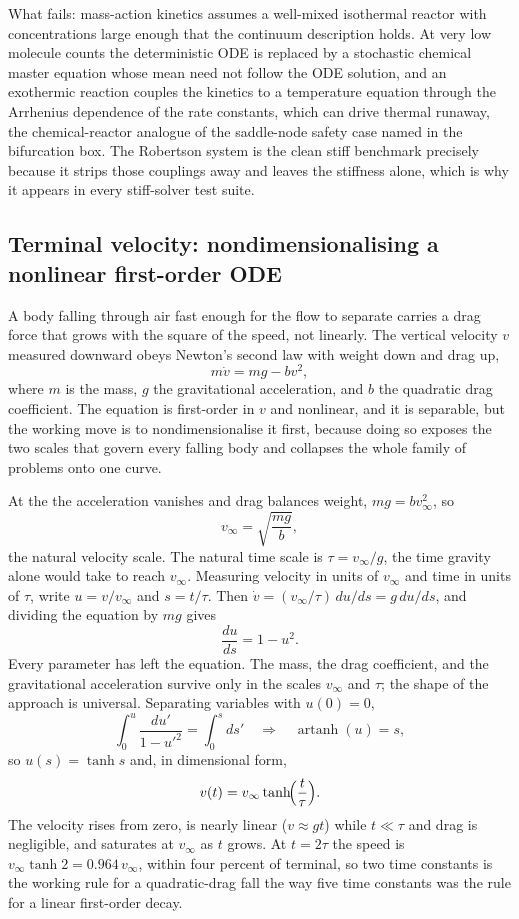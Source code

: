 What fails: mass-action kinetics assumes a well-mixed isothermal
reactor with concentrations large enough that the continuum
description holds. At very low molecule counts the deterministic ODE is
replaced by a stochastic chemical master equation whose mean need not
follow the ODE solution, and an exothermic reaction couples the
kinetics to a temperature equation through the Arrhenius dependence of
the rate constants, which can drive thermal runaway, the
chemical-reactor analogue of the saddle-node safety case named in the
bifurcation box. The Robertson system is the clean stiff benchmark
precisely because it strips those couplings away and leaves the
stiffness alone, which is why it appears in every stiff-solver test
suite.

\subsection{Terminal velocity: nondimensionalising a nonlinear first-order ODE}

A body falling through air fast enough for the flow to separate carries
a drag force that grows with the square of the speed, not linearly. The
vertical velocity $v$ measured downward obeys Newton's second law with
weight down and drag up,
\[
m \dot{v} = m g - b v^{2},
\]
where $m$ is the mass, $g$ the gravitational acceleration, and $b$ the
quadratic drag coefficient. The equation is first-order in $v$ and
nonlinear, and it is separable, but the working move is to
nondimensionalise it first, because doing so exposes the two scales
that govern every falling body and collapses the whole family of
problems onto one curve.

At the  the acceleration vanishes and drag
balances weight, $m g = b v_{\infty}^{2}$, so
\[
v_{\infty} = \sqrt{\frac{m g}{b}},
\]
the natural velocity scale. The natural time scale is
$\tau = v_{\infty}/g$, the time gravity alone would take to reach
$v_{\infty}$. Measuring velocity in units of $v_{\infty}$ and time in
units of $\tau$, write $u = v/v_{\infty}$ and $s = t/\tau$. Then
$\dot{v} = (v_{\infty}/\tau)\, du/ds = g\, du/ds$, and dividing the
equation by $m g$ gives
\[
\frac{du}{ds} = 1 - u^{2}.
\]
Every parameter has left the equation. The mass, the drag coefficient,
and the gravitational acceleration survive only in the scales
$v_{\infty}$ and $\tau$; the shape of the approach is universal.
Separating variables with $u(0) = 0$,
\[
\int_{0}^{u} \frac{du'}{1 - u'^{2}} = \int_{0}^{s} ds'
\quad\Longrightarrow\quad
\operatorname{artanh}(u) = s,
\]
so $u(s) = \tanh s$ and, in dimensional form,
\[
v(t) = v_{\infty} \tanh\!\Bigl(\frac{t}{\tau}\Bigr).
\]
The velocity rises from zero, is nearly linear ($v \approx g t$) while
$t \ll \tau$ and drag is negligible, and saturates at $v_{\infty}$ as
$t$ grows. At $t = 2\tau$ the speed is $v_{\infty} \tanh 2 = 0.964\,
v_{\infty}$, within four percent of terminal, so two time constants is
the working rule for a quadratic-drag fall the way five time constants
was the rule for a linear first-order decay.

